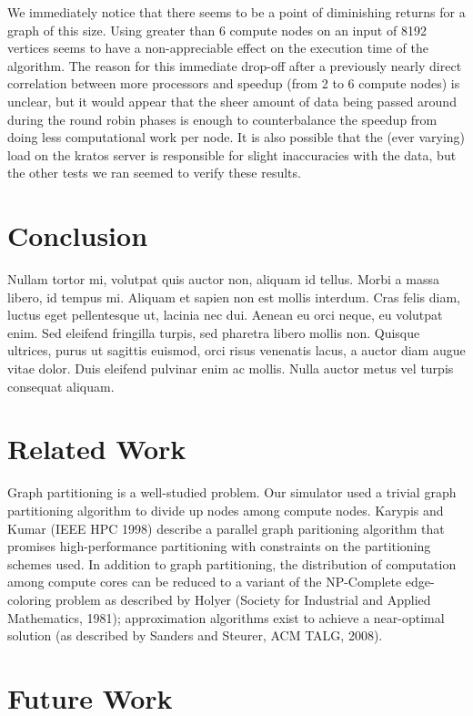 \documentclass[10pt]{article}
\begin{document}
\begin{multicols}{2}
		We immediately notice that there seems to be a point of diminishing returns for a graph of this size. 
		Using greater than 6 compute nodes on an input of 8192 vertices seems to have a non-appreciable effect on the execution time of the algorithm. The reason for this immediate drop-off after a previously nearly direct correlation between more processors and speedup (from 2 to 6 compute nodes) is unclear, but it would appear that the sheer amount of data being passed around during the round robin phases is enough to counterbalance the speedup from doing less computational work per node. It is also possible that the (ever varying) load on the kratos server is responsible for slight inaccuracies with the data, but the other tests we ran seemed to verify these results.
				
		\section*{Conclusion}
		Nullam tortor mi, volutpat quis auctor non, aliquam id tellus. Morbi a massa libero, id tempus mi. Aliquam et sapien non est mollis interdum. Cras felis diam, luctus eget pellentesque ut, lacinia nec dui. Aenean eu orci neque, eu volutpat enim. Sed eleifend fringilla turpis, sed pharetra libero mollis non. Quisque ultrices, purus ut sagittis euismod, orci risus venenatis lacus, a auctor diam augue vitae dolor. Duis eleifend pulvinar enim ac mollis. Nulla auctor metus vel turpis consequat aliquam.
		

		\section*{Related Work}
		Graph partitioning is a well-studied problem.  
		Our simulator used a trivial graph partitioning algorithm to divide up nodes among compute nodes.  
		Karypis and Kumar (IEEE HPC 1998) describe a parallel graph paritioning algorithm that promises high-performance partitioning with constraints on the partitioning schemes used.  
		In addition to graph partitioning, the distribution of computation among compute cores can be reduced to a variant of the NP-Complete edge-coloring problem as described by Holyer (Society for Industrial and Applied Mathematics, 1981); approximation algorithms exist to achieve a near-optimal solution (as described by Sanders and Steurer, ACM TALG, 2008).

		\section*{Future Work}


\end{multicols}
\end{document}
